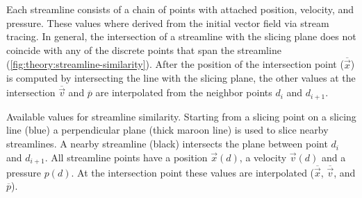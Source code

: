 Each streamline consists of a chain of points with attached position, velocity, and pressure. These values where derived from the initial vector field via stream tracing. In general, the intersection of a streamline with the slicing plane does not coincide with any of the discrete points that span the streamline (\autoref{fig:theory:streamline-similarity}). After the position of the intersection point ($\overline{\vec{x}}$) is computed by intersecting the line with the slicing plane, the other values at the intersection $\overline{\vec{v}}$ and $\overline{p}$ are interpolated from the neighbor points $d_i$ and $d_{i+1}$.


{Available values for streamline similarity. Starting from a slicing point on a slicing line (blue) a perpendicular plane (thick maroon line) is used to slice nearby streamlines. A nearby streamline (black) intersects the plane between point $d_i$ and $d_{i+1}$. All streamline points have a position $\vec{x}(d)$, a velocity $\vec{v}(d)$ and a pressure $p(d)$. At the intersection point these values are interpolated ($\overline{\vec{x}}$, $\overline{\vec{v}}$, and $\overline{p}$).}

